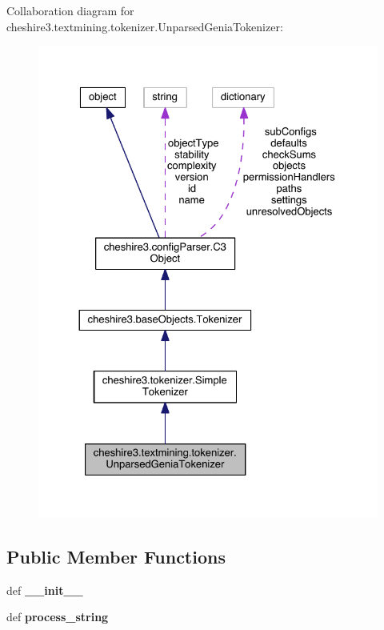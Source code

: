 Collaboration diagram for cheshire3.\-textmining.\-tokenizer.\-Unparsed\-Genia\-Tokenizer\-:
\nopagebreak
\begin{figure}[H]
\begin{center}
\leavevmode
\includegraphics[width=326pt]{classcheshire3_1_1textmining_1_1tokenizer_1_1_unparsed_genia_tokenizer__coll__graph}
\end{center}
\end{figure}
\subsection*{Public Member Functions}
\begin{DoxyCompactItemize}
\item 
\hypertarget{classcheshire3_1_1textmining_1_1tokenizer_1_1_unparsed_genia_tokenizer_aeeb18782c8fc1e27da172be58afe6e95}{def {\bfseries \-\_\-\-\_\-init\-\_\-\-\_\-}}\label{classcheshire3_1_1textmining_1_1tokenizer_1_1_unparsed_genia_tokenizer_aeeb18782c8fc1e27da172be58afe6e95}

\item 
\hypertarget{classcheshire3_1_1textmining_1_1tokenizer_1_1_unparsed_genia_tokenizer_af4e16910bfa64afcf1ea0d211ea31314}{def {\bfseries process\-\_\-string}}\label{classcheshire3_1_1textmining_1_1tokenizer_1_1_unparsed_genia_tokenizer_af4e16910bfa64afcf1ea0d211ea31314}

\end{DoxyCompactItemize}
